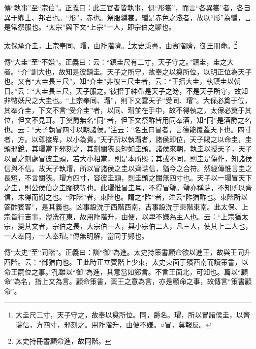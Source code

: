 {\noindent\zhuan{}\fzbyks 傳“執事”至“宗伯”。正義曰：此三官者皆執事，俱“彤裳”，而言“各異裳”者，各自異于卿士、邦君也。“彤”，赤也。祭服纁裳。纁是赤色之淺者，故以“彤”為纁，言是常祭服也。“太宗”與下文“上宗”一人，即宗伯之卿也。 \par}

太保承介圭，上宗奉同、瑁，由阼階隮。\footnote{大圭尺二寸，天子守之，故奉以奠所位。同，爵名。瑁，所以冒諸侯圭，以齊瑞信，方四寸，邪刻之。用阼階升，由便不嫌。○冒，莫報反。}太史秉書，由賓階隮，御王冊命。\footnote{太史持冊書顧命進，故同階。}

{\noindent\zhuan{}\fzbyks 傳“大圭”至“不嫌”。正義曰：云：“鎮圭尺有二寸，天子守之。”鎮圭，圭之大者。“介”訓大也，故知是彼鎮圭。天子之所守，故奉之以奠所位，以明正位為天子也。又有“大圭長三尺”，知“介圭”非彼三尺圭者，云：“王搢大圭，執鎮圭以朝日。”云：“大圭長三尺，天子服之。”彼搢于紳帶是天子之笏，不是天子所守，故知非幣妖尺之大圭也。“上宗奉同、瑁”，則下文雲天子“受同、瑁”。大保必奠于位，其奉介圭，下文不言“受介圭”者，以同、瑁並在手中，故不得執之，太保必奠于其位，但文不見耳。于奠爵無名“同”者，但下文祭酢皆用同奉酒，知“同”是酒爵之名也。云：“天子執冒四寸以朝諸侯。”注云：“名玉曰冒者，言德能覆蓋天下也。四寸者，方。以尊接卑，以小為貴。”天子所以執瑁者，諸侯即位，天子賜之以命圭，圭頭邪銳，其瑁當下邪刻之，其刻闊狹長短如圭頭。諸侯來朝，執圭以授天子，天子以冒之刻處冒彼圭頭，若大小相當，則是本所賜；其或不同，則圭是偽作，知諸侯信與不信。故天子執瑁，所以冒諸侯之圭以齊瑞信，猶今之合符。然經傳惟言圭之長短，不言闊狹。瑁方四寸，容彼圭頭，則圭頭之闊無四寸也。天子以一瑁冒天下之圭，則公侯伯之圭闊狹等也。此瑁惟冒圭耳，不得冒璧。璧亦稱瑞，不知所以齊信，未得而聞之也。“阼階”者，東階也。謂之“阼”者，注云“阼猶酢也。東階所以答酢賓客”，是其義也。凶事設洗于西階西南，吉事設洗于東階東南。此太保、上宗皆行吉事，盥洗在東，故用阼階升，由便，以卑不嫌為主人也。云：“上宗猶太宗，變其文者，宗伯之長，大宗伯一人，與小宗伯二人，凡三人，使其上二人也，一人奉同，一人奉瑁。”傳無明解，當同于鄭也。 \par}

{\noindent\zhuan{}\fzbyks 傳“太史”至“同階”。正義曰：訓“御”為進。太史持策書顧命欲以進王，故與王同升西階。云：“御猶向也。王此時正立賓階上少東，太史東面于殯西南而讀策書，以命王嗣位之事。”孔雖以“御”為進，其意當如鄭言。不言王面北，可知也。篇以“顧命”為名，指上文為言。顧命策書，稟王之意為言，亦是顧命之事，故傳言“策書顧命”。 \par}

